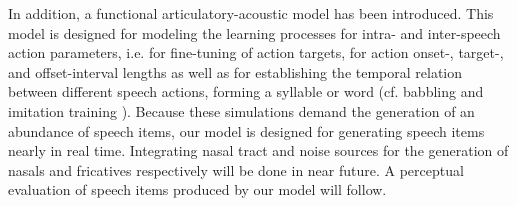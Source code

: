 \documentclass[conference]{IEEEtran}
\begin{document}
In addition, a functional articulatory-acoustic model has been
introduced. This model is designed for modeling the learning processes
for intra- and inter-speech action parameters, i.e. for fine-tuning of
action targets, for action onset-, target-, and offset-interval
lengths as well as for establishing the temporal relation between
different speech actions, forming a syllable or word (cf. babbling and
imitation training \cite{kroger2009,kroger2014}). Because these
simulations demand the generation of an abundance of speech items,
our model is designed for generating speech items nearly in real time.
Integrating nasal tract and noise sources for the generation of nasals
and fricatives respectively will be done in near future. A perceptual
evaluation of speech items produced by our model will follow.




\end{document}
